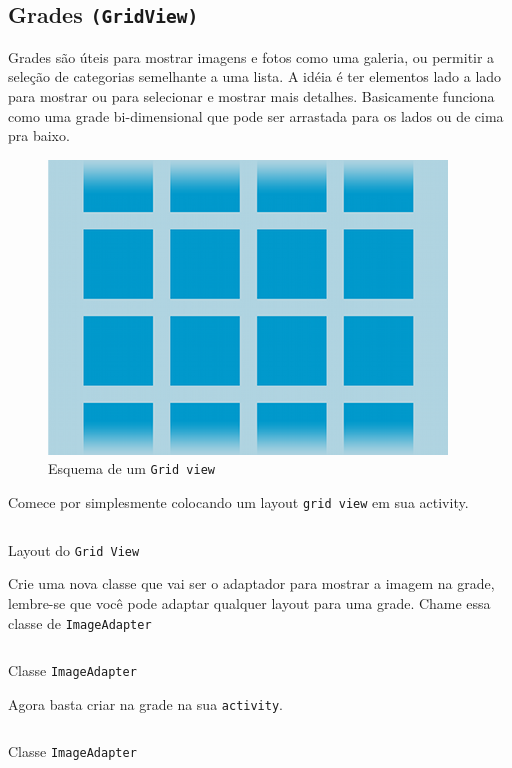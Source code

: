 \documentclass[a4paper,12pt,brazil,doubleside]{book}
\begin{document}
\begin{singlespace}
\section{Grades \texttt{(GridView)}}

Grades são úteis para mostrar imagens e fotos como uma galeria, ou permitir a seleção de categorias semelhante a uma lista. A idéia é ter elementos lado a lado para mostrar ou para selecionar e mostrar mais detalhes. Basicamente funciona como uma grade bi-dimensional que pode ser arrastada para os lados ou de cima pra baixo. 

\begin{figure}[H]
  \centering
  \includegraphics[width=.475\textwidth]{figuras/design/gridview.png}
  \caption{Esquema de um \texttt{Grid view}}
  \label{fig:e}
\end{figure}

\newpage 
Comece por simplesmente colocando um layout \texttt{grid view} em sua activity.

\begin{listing}[H]
\inputminted[linenos=true,fontsize=\small,frame=lines, framesep=2mm, tabsize=2,numbersep=5pt]{xml}{src/design/gridview.xml}
\caption{Layout do \texttt{Grid View}}
\end{listing}	
\newpage
Crie uma nova classe que vai ser o adaptador para mostrar a imagem na grade, lembre-se que você pode adaptar qualquer layout para uma grade. Chame essa classe de \texttt{ImageAdapter}

\begin{listing}[H]
\inputminted[linenos=true,fontsize=\small,frame=lines, framesep=2mm, tabsize=2,numbersep=5pt]{java}{src/design/imageadapter.java}
\caption{Classe \texttt{ImageAdapter}}
\end{listing}	

Agora basta criar na grade na sua \texttt{activity}.

\begin{listing}[H]
\inputminted[linenos=true,fontsize=\small,frame=lines, framesep=2mm, tabsize=2,numbersep=5pt]{java}{src/design/grade-activity.java}
\caption{Classe \texttt{ImageAdapter}}
\end{listing}	


\end{singlespace}
\end{document}
